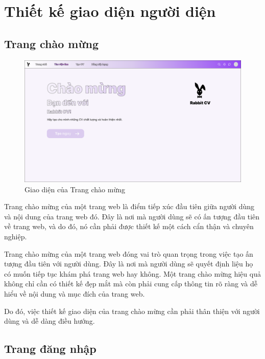 \chapter{Thiết kế giao diện người diện}

\section{Trang chào mừng}

\begin{figure}[H]
\begin{center}
    \includegraphics[scale=0.2]{img/Welcome.png}
    \caption{Giao diện của Trang chào mừng}
\end{center}
\end{figure}

Trang chào mừng của một trang web là điểm tiếp xúc đầu tiên giữa người dùng và nội dung của trang web đó. Đây là nơi mà người dùng sẽ có ấn tượng đầu tiên về trang web, và do đó, nó cần phải được thiết kế một cách cẩn thận và chuyên nghiệp.

Trang chào mừng của một trang web đóng vai trò quan trọng trong việc tạo ấn tượng đầu tiên với người dùng. Đây là nơi mà người dùng sẽ quyết định liệu họ có muốn tiếp tục khám phá trang web hay không. Một trang chào mừng hiệu quả không chỉ cần có thiết kế đẹp mắt mà còn phải cung cấp thông tin rõ ràng và dễ hiểu về nội dung và mục đích của trang web. 

Do đó, việc thiết kế giao diện của trang chào mừng cần phải thân thiện với người dùng và dễ dàng điều hướng.

\section{Trang đăng nhập}

